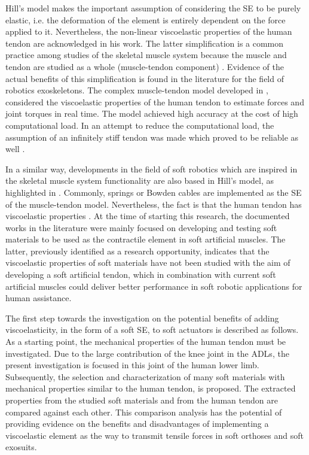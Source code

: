 Hill's model makes the important assumption of considering the SE to be purely elastic, i.e. the deformation of the element is entirely dependent on the force applied to it. Nevertheless, the non-linear viscoelastic properties of the human tendon are acknowledged in his work. The latter simplification is a common practice among studies of the skeletal muscle system because the muscle and tendon are studied as a whole (muscle-tendon component) \cite{zajac1989muscle}. Evidence of the actual benefits of this simplification is found in the literature for the field of robotics exoskeletons. The complex muscle-tendon model developed in \cite{lloyd2003emg}, considered the viscoelastic properties of the human tendon to estimate forces and joint torques in real time. The model achieved high accuracy at the cost of high computational load. In an attempt to reduce the computational load, the assumption of an infinitely stiff tendon was made which proved to be reliable as well \cite{sartori2009stiff}.

In a similar way, developments in the field of soft robotics which are inspired in the skeletal muscle system functionality are also based in Hill's model, as highlighted in . Commonly, springs \cite{park2011bio} or Bowden cables \cite{Zhang2013a} are implemented as the SE of the muscle-tendon model. Nevertheless, the fact is that the human tendon has viscoelastic properties \cite{maurel1998biomechanical}. At the time of starting this research, the documented works in the literature were mainly focused on developing and testing soft materials to be used as the contractile element in soft artificial muscles. The latter, previously identified as a research opportunity, indicates that the viscoelastic properties of soft materials have not been studied with the aim of developing a soft artificial tendon, which in combination with current soft artificial muscles could deliver better performance in soft robotic applications for human assistance.

The first step towards the investigation on the potential benefits of adding viscoelasticity, in the form of a soft SE, to soft actuators is described as follows. As a starting point, the mechanical properties of the human tendon must be investigated. Due to the large contribution of the knee joint in the ADLs, the present investigation is focused in this joint of the human lower limb. Subsequently, the selection and characterization of many soft materials with mechanical properties similar to the human tendon, is proposed. The extracted properties from the studied soft materials and from the human tendon are compared against each other. This comparison analysis has the potential of providing evidence on the benefits and disadvantages of implementing a viscoelastic element as the way to transmit tensile forces in soft orthoses and soft exosuits.

